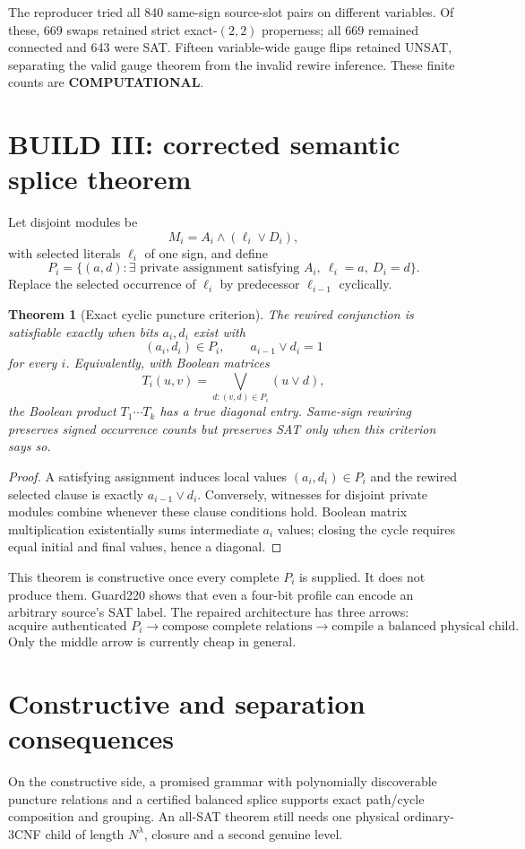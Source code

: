 \documentclass[11pt]{article}
\newtheorem{theorem}{Theorem}
\newcommand{\COMP}{\textbf{COMPUTATIONAL}}
\begin{document}
The reproducer tried all 840 same-sign source-slot pairs on different
variables. Of these, 669 swaps retained strict exact-$(2,2)$ properness; all
669 remained connected and 643 were SAT. Fifteen variable-wide gauge flips
retained UNSAT, separating the valid gauge theorem from the invalid rewire
inference. These finite counts are \COMP.

\section{BUILD III: corrected semantic splice theorem}
Let disjoint modules be
\[
M_i=A_i\wedge(\ell_i\vee D_i),
\]
with selected literals $\ell_i$ of one sign, and define
\[
P_i=\{(a,d):\exists\text{ private assignment satisfying }A_i,\
\ell_i=a,\ D_i=d\}.
\]
Replace the selected occurrence of $\ell_i$ by predecessor $\ell_{i-1}$
cyclically.

\begin{theorem}[Exact cyclic puncture criterion]\label{t:puncture}
The rewired conjunction is satisfiable exactly when bits $a_i,d_i$ exist with
\[
(a_i,d_i)\in P_i,\qquad a_{i-1}\vee d_i=1
\]
for every $i$. Equivalently, with Boolean matrices
\[
T_i(u,v)=\bigvee_{d:(v,d)\in P_i}(u\vee d),
\]
the Boolean product $T_1\cdots T_k$ has a true diagonal entry. Same-sign
rewiring preserves signed occurrence counts but preserves SAT only when this
criterion says so.
\end{theorem}
\begin{proof}
A satisfying assignment induces local values $(a_i,d_i)\in P_i$ and the
rewired selected clause is exactly $a_{i-1}\vee d_i$. Conversely, witnesses
for disjoint private modules combine whenever these clause conditions hold.
Boolean matrix multiplication existentially sums intermediate $a_i$ values;
closing the cycle requires equal initial and final values, hence a diagonal.
\end{proof}

This theorem is constructive once every complete $P_i$ is supplied. It does
not produce them. Guard220 shows that even a four-bit profile can encode an
arbitrary source's SAT label. The repaired architecture has three arrows:
\[
\boxed{\text{acquire authenticated }P_i}\longrightarrow
\boxed{\text{compose complete relations}}\longrightarrow
\boxed{\text{compile a balanced physical child}}.
\]
Only the middle arrow is currently cheap in general.

\section{Constructive and separation consequences}
On the constructive side, a promised grammar with polynomially discoverable
puncture relations and a certified balanced splice supports exact path/cycle
composition and grouping. An all-SAT theorem still needs one physical
ordinary-3CNF child of length $N^\lambda$, closure and a second genuine level.
\end{document}
